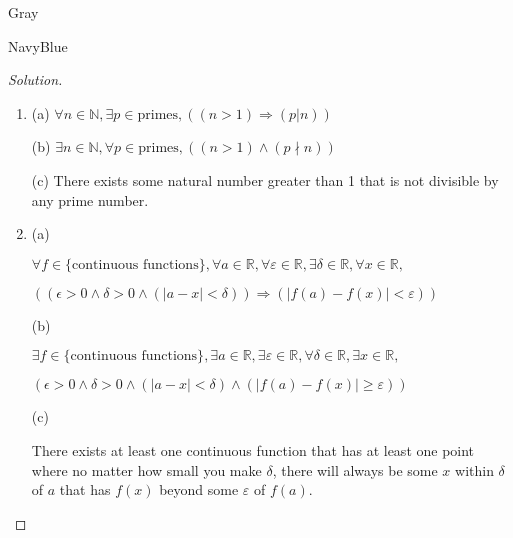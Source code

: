 \documentclass[12pt]{amsart}
\theoremstyle{named}
\newenvironment{soln}
{\begin{color}{Gray}\begin{framed}\begin{color}{NavyBlue}\begin{proof}[Solution]
\doublespacing}
{\end{proof}\end{color}\end{framed}\end{color}}
\theoremstyle{definition}
\begin{document}
\begin{soln}
    \phantom{ }

	\begin{enumerate}
        \item \phantom{ }
        
        \noindent(a) $\forall n \in \mathbb N,\exists p \in {\text{primes}},((n > 1) \Rightarrow (p|n))$

        \noindent(b) $\exists n \in \mathbb N, \forall p \in {\text{primes}},((n > 1) \land (p \nmid n))$

        \noindent(c) There exists some natural number greater than 1 that is not
        divisible by any prime number. 

        \item \phantom{ }
        
        \noindent (a)
        
        $\forall f \in \text{\{continuous functions\}},\forall a \in \mathbb R, \forall \varepsilon \in \mathbb R, \exists \delta \in \mathbb R,
        \forall x \in \mathbb R,$
        
        $((\epsilon > 0 \land \delta > 0 \land (|a - x| < \delta) ) \Rightarrow (|f(a) - f(x)|<\varepsilon))$

        \noindent (b)

        $\exists f \in \text{\{continuous functions\}},\exists a \in \mathbb R, \exists \varepsilon \in \mathbb R, \forall \delta \in \mathbb R,
        \exists x \in \mathbb R,$
        
        $(\epsilon > 0 \land \delta > 0 \land (|a - x| < \delta) \land (|f(a) - f(x)| \geq \varepsilon))$

        \noindent (c) 
        

        \noindent There exists at least one continuous function that has at least one point where no matter
        how small you make $\delta$, there will always be some $x$ within $\delta$ of $a$ that
        has $f(x)$ beyond some $\varepsilon$ of $f(a)$. 

        \phantom{ }

        \phantom{ }

        \phantom{ }

        \phantom{ }


\end{enumerate}
\end{soln}
\end{document}
